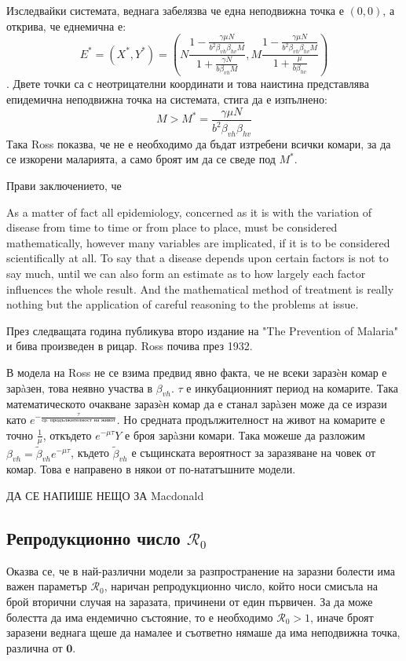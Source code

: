 Изследвайки системата, веднага забелязва че една неподвижна точка е $(0,0)$, а открива, че еднемична е:
\begin{equation*}
  E^* = (X^*, Y^*) = \left(N \frac{1 - \frac{\gamma \mu N}{b^2 \beta_{vh} \beta_{hv} M}}{1 + \frac{\gamma N}{b \beta_{vh} M}}, M \frac{1 - \frac{\gamma \mu N}{b^2 \beta_{vh} \beta_{hv} M}}{1 + \frac{\mu}{b \beta_{hv}}}\right)
\end{equation*}.
Двете точки са с неотрицателни координати и това наистина представлява епидемична неподвижна точка на системата, стига да е изпълнено:
\begin{equation}
  \label{eq:RossM}
  M > M^* = \frac{\gamma \mu N}{b^2 \beta_{vh} \beta_{hv}}
\end{equation}
Така Ross показва, че не е необходимо да бъдат изтребени всички комари, за да се изкорени маларията, а само броят им да се сведе под $M^*$.

Прави заключението, че
\begin{displayquote}
  As a matter of fact all epidemiology, concerned as it is with the variation of disease from
  time to time or from place to place, must be considered mathematically, however many
  variables are implicated, if it is to be considered scientifically at all. To say that a disease
  depends upon certain factors is not to say much, until we can also form an estimate as to how
  largely each factor influences the whole result. And the mathematical method of treatment
  is really nothing but the application of careful reasoning to the problems at issue.
\end{displayquote}
През следващата година публикува второ издание на "The Prevention of Malaria" и бива произведен в рицар. Ross почива през 1932.

В модела на Ross не се взима предвид явно факта, че не всеки заразèн комар е зарàзен, това неявно участва в $\beta_{vh}$.
$\tau$ е инкубационният период на комарите. Така математическото очакване заразèн комар да е станал зарàзен може да се изрази като $e^{-\frac{\tau}{\text{ср. продължителност на живот}}}$. Но средната продължителност на живот на комарите е точно $\frac{1}{\mu}$, откъдето $e^{-\mu\tau}Y$ е броя зарàзни комари.
Така можеше да разложим $\beta_{vh} = \tilde{\beta}_{vh} e^{-\mu\tau}$, където $\tilde{\beta}_{vh}$ е същинската вероятност за заразяване на човек от комар. Това е направено в някои от по-нататъшните модели.

\color{Red} ДА СЕ НАПИШЕ НЕЩО ЗА Macdonald
\color{Black}

\subsection{Репродукционно число $\mathscr{R}_0$}
Оказва се, че в най-различни модели за разпространение на заразни болести има важен параметър $\mathscr{R}_0$, наричан репродукционно число, който носи смисъла на брой вторични случая на заразата, причинени от един първичен. За да може болестта да има ендемично състояние, то е необходимо $\mathscr{R}_0 > 1$, иначе броят заразени веднага щеше да намалее и съответно нямаше да има неподвижна точка, различна от $\mathbf{0}$.

